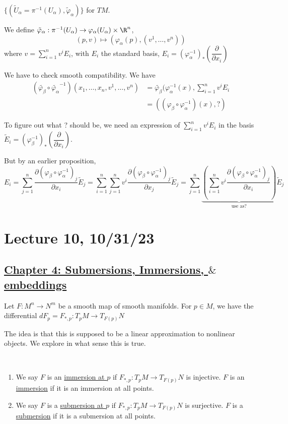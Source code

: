 \documentclass[x11names,reqno,14pt]{extarticle}
\newcommand{\pp}[2]{\dfrac{\partial #1}{\partial #2}}
\renewcommand{\phi}{\varphi}
\begin{document}
$\{(\tilde{U}_\alpha = \pi^{-1}(U_\alpha),\tilde{\phi}_\alpha)\}$ for $TM$. 

We define $\tilde{\phi}_\alpha:\pi^{-1}(U_\alpha) \to \phi_\alpha(U_\alpha)\times\R^n$, 
\[
(p, v) \mapsto (\phi_\alpha(p), (v^1, \dots, v^n))
\]
where $v = \sum_{i=1}^nv^i E_i$, with $E_i$ the standard basis, $E_i = (\phi_\alpha^{-1})_*\left(\pp{}{x_i}\right)$

We have to check smooth compatibility. We have
\begin{align*}
(\tilde{\phi_\beta} \circ \tilde{\phi_\alpha}^{-1})(x_1, \dots, x_n, v^1, \dots, v^n) & = \tilde{\phi_\beta}(\phi_\alpha^{-1}(x), \sum_{i=1}^nv^iE_i \\
							  & = ((\phi_\beta\circ\phi_\alpha^{-1})(x), ?)
\end{align*}

To figure out what ? should be, we need an expression of $\sum_{i=1}^nv^iE_i$ in the basis $\tilde{E}_i = (\phi_\beta^{-1})_*\left(\pp{}{x_i}\right)$. 

But by an earlier proposition, 
\[
E_i = \sum_{j=1}^n\pp{(\phi_\beta\circ\phi_\alpha^{-1})_j}{x_i}\tilde{E}_j = \sum_{i=1}^n\sum_{j=1}^n v^i\pp{(\phi_\beta\circ\phi_\alpha^{-1})_j}{x_j}\tilde{E}_j = \sum_{j=1}^n\underbrace{\left(\sum_{i=1}^nv^i\pp{(\phi_\beta\circ\phi_\alpha^{-1})_j}{x_i}\right)}_{\text{use as}?}\tilde{E}_j
\]


\section*{Lecture 10, 10/31/23}

\subsection*{\underline{Chapter 4: Submersions, Immersions, $\&$ embeddings}}

Let $F:M^n\to N^m$ be a smooth map of smooth manifolds. For $p \in M$, we have the differential $dF_p = F_{*,p}:T_pM\to T_{F(p)}N$

The idea is that this is supposed to be a linear approximation to nonlinear objects. We explore in what sense this is true. 

\,

\begin{enumerate}[label=(\alph*)]

\item We say $F$ is an \underline{immersion at $p$} if $F_{*,p}:T_pM\to T_{F(p)}N$ is injective. $F$ is an \underline{immersion} if it is an immersion at all points. 

\item We say $F$ is a \underline{submersion at $p$} if $F_{*,p}:T_pM\to T_{F(p)}N$ is surjective. $F$ is a \underline{submersion} if it is a submersion at all points. 

\end{enumerate}
\end{document}
